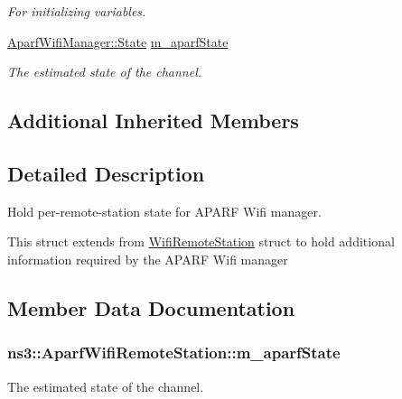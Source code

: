 \begin{DoxyCompactItemize}
\begin{DoxyCompactList}\small\item\em For initializing variables. \end{DoxyCompactList}\item 
\hyperlink{classns3_1_1AparfWifiManager_a5b338779a4468212d544d6830f1a8237}{Aparf\+Wifi\+Manager\+::\+State} \hyperlink{structns3_1_1AparfWifiRemoteStation_aae26aa025561291c07ee19d662895725}{m\+\_\+aparf\+State}
\begin{DoxyCompactList}\small\item\em The estimated state of the channel. \end{DoxyCompactList}\end{DoxyCompactItemize}
\subsection*{Additional Inherited Members}


\subsection{Detailed Description}
Hold per-\/remote-\/station state for A\+P\+A\+RF Wifi manager.

This struct extends from \hyperlink{structns3_1_1WifiRemoteStation}{Wifi\+Remote\+Station} struct to hold additional information required by the A\+P\+A\+RF Wifi manager 

\subsection{Member Data Documentation}
\subsubsection[{\texorpdfstring{m\+\_\+aparf\+State}{m_aparfState}}]{ ns3\+::\+Aparf\+Wifi\+Remote\+Station\+::m\+\_\+aparf\+State}\hypertarget{structns3_1_1AparfWifiRemoteStation_aae26aa025561291c07ee19d662895725}{}\label{structns3_1_1AparfWifiRemoteStation_aae26aa025561291c07ee19d662895725}


The estimated state of the channel. 

